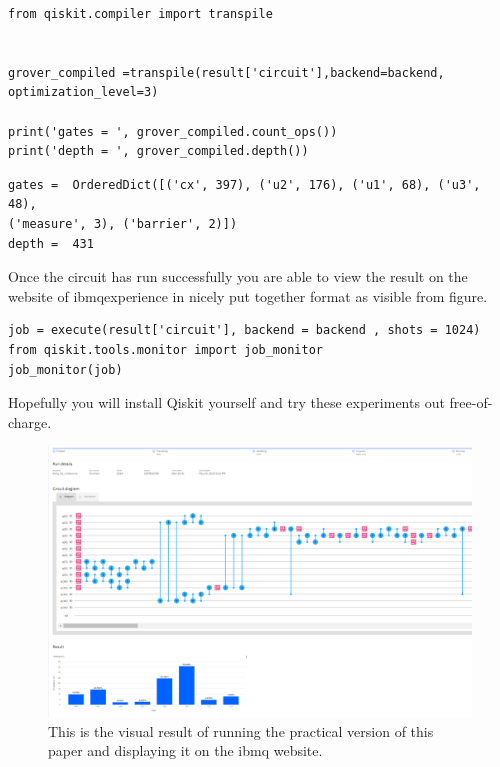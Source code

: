 \begin{verbatim}
from qiskit.compiler import transpile


grover_compiled =transpile(result['circuit'],backend=backend, 
optimization_level=3)

print('gates = ', grover_compiled.count_ops())
print('depth = ', grover_compiled.depth())
\end{verbatim}

\begin{verbatim}
gates =  OrderedDict([('cx', 397), ('u2', 176), ('u1', 68), ('u3', 48),
('measure', 3), ('barrier', 2)])
depth =  431
\end{verbatim}

Once the circuit has run successfully you are able to view the result on the website of ibmqexperience in nicely put together format as visible from figure.

\begin{verbatim}
job = execute(result['circuit'], backend = backend , shots = 1024)
from qiskit.tools.monitor import job_monitor
job_monitor(job)
\end{verbatim}

Hopefully you will install Qiskit yourself and try these experiments out free-of-charge.



\begin{figure}
	\centering
	\includegraphics[scale = 0.50]{../Demonstration/img/ibmq_result.PNG}
	\caption{This is the visual result of running the practical version of this paper and displaying it on the ibmq website.}
\end{figure}
